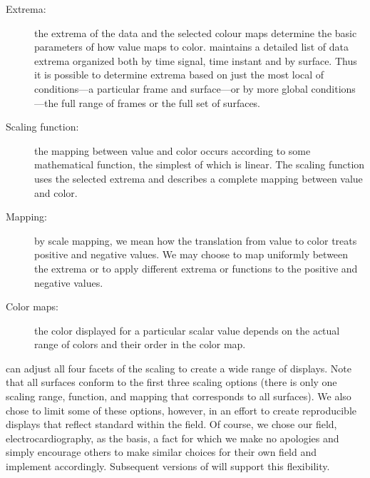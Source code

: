 \begin{description}
  \item [Extrema: ] the extrema of the data and the selected colour maps
        determine the basic parameters of how value maps to color.  \map{}
        maintains a detailed list of data extrema organized both by time
        signal, time instant and by surface.  Thus it is possible to determine
        extrema based on just the most local of conditions---a particular
        frame and surface---or by more global conditions---the full range
        of frames or the full set of surfaces.
  \item [Scaling function: ] the mapping between value and color occurs
        according to some mathematical function, the simplest of which
        is linear.   The scaling function uses the selected extrema and
        describes a complete mapping between value and color.
  \item [Mapping: ] by scale mapping, we mean how the translation from
        value to color treats positive and negative values.  We may choose
        to map uniformly between the extrema or to apply different
        extrema or functions to the positive and negative values.
  \item [Color maps: ] the color displayed for a particular scalar value
        depends on the actual range of colors and their order in the color
        map.
\end{description}

\map{} can adjust all four facets of the scaling to create a wide range of
displays.  Note that all surfaces conform to the first three scaling
options (there is only one scaling range, function, and mapping that
corresponds to all surfaces).  We also chose to limit some of these 
options, however, in an effort
to create reproducible displays that reflect standard within the field.  Of
course, we chose our field, electrocardiography, as the basis, a fact for
which we make no apologies and simply encourage others to make similar
choices for their own field and implement \map{} accordingly.  Subsequent
versions of \map{} will support this flexibility.

